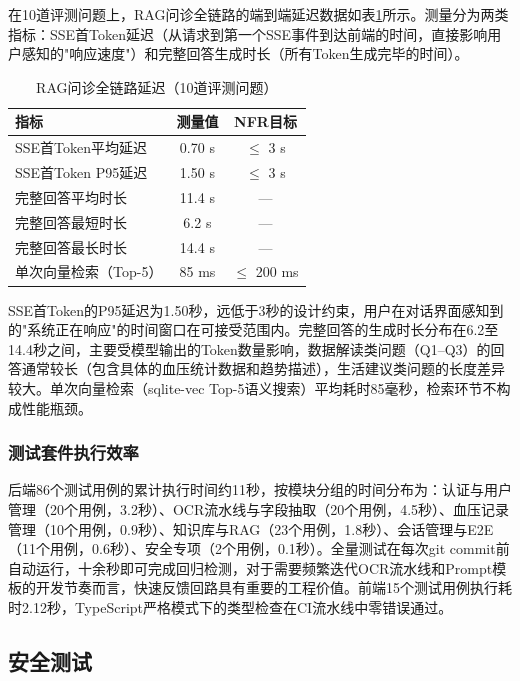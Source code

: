 \documentclass[zihao=-4,a4paper]{ctexart}
\numberwithin{figure}{section}
\numberwithin{table}{section}
\begin{document}
在10道评测问题上，RAG问诊全链路的端到端延迟数据如表\ref{tab:perf-rag}所示。测量分为两类指标：SSE首Token延迟（从请求到第一个SSE事件到达前端的时间，直接影响用户感知的"响应速度"）和完整回答生成时长（所有Token生成完毕的时间）。

\begin{table}[H]
\centering
\caption{RAG问诊全链路延迟（10道评测问题）}
\label{tab:perf-rag}
\begin{tabular}{lcc}
\toprule
\textbf{指标} & \textbf{测量值} & \textbf{NFR目标} \\
\midrule
SSE首Token平均延迟 & 0.70 s & $\leq$ 3 s \\
SSE首Token P95延迟 & 1.50 s & $\leq$ 3 s \\
完整回答平均时长 & 11.4 s & — \\
完整回答最短时长 & 6.2 s & — \\
完整回答最长时长 & 14.4 s & — \\
单次向量检索（Top-5） & 85 ms & $\leq$ 200 ms \\
\bottomrule
\end{tabular}
\end{table}

SSE首Token的P95延迟为1.50秒，远低于3秒的设计约束，用户在对话界面感知到的"系统正在响应"的时间窗口在可接受范围内。完整回答的生成时长分布在6.2至14.4秒之间，主要受模型输出的Token数量影响，数据解读类问题（Q1--Q3）的回答通常较长（包含具体的血压统计数据和趋势描述），生活建议类问题的长度差异较大。单次向量检索（sqlite-vec Top-5语义搜索）平均耗时85毫秒，检索环节不构成性能瓶颈。

\subsubsection{测试套件执行效率}

后端86个测试用例的累计执行时间约11秒，按模块分组的时间分布为：认证与用户管理（20个用例，3.2秒）、OCR流水线与字段抽取（20个用例，4.5秒）、血压记录管理（10个用例，0.9秒）、知识库与RAG（23个用例，1.8秒）、会话管理与E2E（11个用例，0.6秒）、安全专项（2个用例，0.1秒）。全量测试在每次git commit前自动运行，十余秒即可完成回归检测，对于需要频繁迭代OCR流水线和Prompt模板的开发节奏而言，快速反馈回路具有重要的工程价值。前端15个测试用例执行耗时2.12秒，TypeScript严格模式下的类型检查在CI流水线中零错误通过。

\subsection{安全测试}
\end{document}
